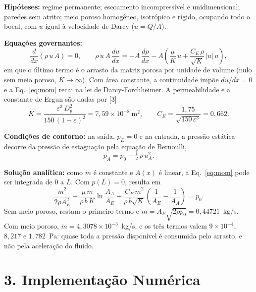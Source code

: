 \textbf{Hipóteses:} regime permanente; escoamento incompressível e
unidimensional; paredes sem atrito; meio poroso homogêneo, isotrópico e
rígido, ocupando todo o bocal, com $u$ igual à velocidade de Darcy
($u=Q/A$).

\textbf{Equações governantes:}
\begin{equation}
  \frac{d}{dx}\left(\rho\,u\,A\right)=0 ,
  \qquad
  \rho\,u\,A\,\frac{du}{dx}
  =-A\,\frac{dp}{dx}
  -A\left(\frac{\mu}{K}\,u+\frac{C_E\,\rho}{\sqrt{K}}\,|u|\,u\right) ,
  \label{eq:mom}
\end{equation}
em que o último termo é o arrasto da matriz porosa por unidade de volume
(nulo sem meio poroso, $K\to\infty$). Com área constante, a continuidade
impõe $du/dx=0$ e a Eq.~\eqref{eq:mom} recai na lei de Darcy-Forchheimer.
A permeabilidade e a constante de Ergun são dadas por [3]
\begin{equation}
  K=\frac{\varepsilon^3\,D_p^2}{150\,(1-\varepsilon)^2}=7{,}59\times10^{-8}~\mathrm{m^2},
  \qquad
  C_E=\frac{1{,}75}{\sqrt{150\,\varepsilon^3}}=0{,}662 .
\end{equation}

\textbf{Condições de contorno:} na saída, $p_E=0$ e na entrada, a pressão
estática decorre da pressão de estagnação pela equação de Bernoulli,
\begin{equation}
  p_A=p_0-\tfrac12\,\rho\,u_A^2 .
  \label{eq:bern}
\end{equation}

\textbf{Solução analítica:} como $\dot m$ é constante e $A(x)$ é linear, a
Eq.~\eqref{eq:mom} pode ser integrada de 0 a $L$. Com $p(L)=0$, resulta em
\begin{equation}
  \frac{\dot m^2}{2\rho A_E^2}
  +\frac{\mu\,\dot m}{\rho\,b\,K}\ln\frac{A_A}{A_E}
  +\frac{C_E\,\dot m^2}{\rho\,b\sqrt{K}}\left(\frac{1}{A_E}-\frac{1}{A_A}\right)
  =p_0 .
  \label{eq:exata}
\end{equation}
Sem meio poroso, restam o primeiro termo e
$\dot m=A_E\sqrt{2\rho p_0}=0{,}44721$~kg/s. Com meio poroso,
$\dot m=4{,}3078\times10^{-3}$~kg/s, e os três termos valem
$9\times10^{-4}$, $8{,}217$ e $1{,}782$~Pa: quase toda a pressão
disponível é consumida pelo arrasto, e não pela aceleração do fluido.

\section*{3. Implementação Numérica}

